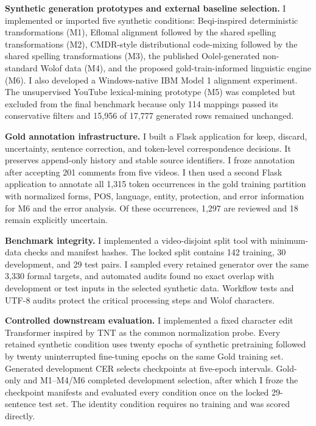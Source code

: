 \documentclass[12pt, a4paper, twoside, openany]{report}
\begin{document}
\noindent\textbf{Synthetic generation prototypes and external baseline selection.}
I implemented or imported five synthetic conditions: Beqi-inspired deterministic transformations (M1), Eflomal alignment followed by the shared spelling transformations (M2), CMDR-style distributional code-mixing followed by the shared spelling transformations (M3), the published Oolel-generated non-standard Wolof data (M4), and the proposed gold-train-informed linguistic engine (M6). I also developed a Windows-native IBM Model 1 alignment experiment. The unsupervised YouTube lexical-mining prototype (M5) was completed but excluded from the final benchmark because only 114 mappings passed its conservative filters and 15,956 of 17,777 generated rows remained unchanged.


\noindent\textbf{Gold annotation infrastructure.}
I built a Flask application for keep, discard, uncertainty, sentence correction, and token-level correspondence decisions. It preserves append-only history and stable source identifiers. I froze annotation after accepting 201 comments from five videos. I then used a second Flask application to annotate all 1,315 token occurrences in the gold training partition with normalized forms, POS, language, entity, protection, and error information for M6 and the error analysis. Of these occurrences, 1,297 are reviewed and 18 remain explicitly uncertain.

\noindent\textbf{Benchmark integrity.}
I implemented a video-disjoint split tool with minimum-data checks and manifest hashes. The locked split contains 142 training, 30 development, and 29 test pairs. I sampled every retained generator over the same 3,330 formal targets, and automated audits found no exact overlap with development or test inputs in the selected synthetic data. Workflow tests and UTF-8 audits protect the critical processing steps and Wolof characters.

\noindent\textbf{Controlled downstream evaluation.}
I implemented a fixed character edit Transformer inspired by TNT as the common normalization probe. Every retained synthetic condition uses twenty epochs of synthetic pretraining followed by twenty uninterrupted fine-tuning epochs on the same Gold training set. Generated development \ac{CER} selects checkpoints at five-epoch intervals. Gold-only and M1--M4/M6 completed development selection, after which I froze the checkpoint manifests and evaluated every condition once on the locked 29-sentence test set. The identity condition requires no training and was scored directly.
\end{document}
